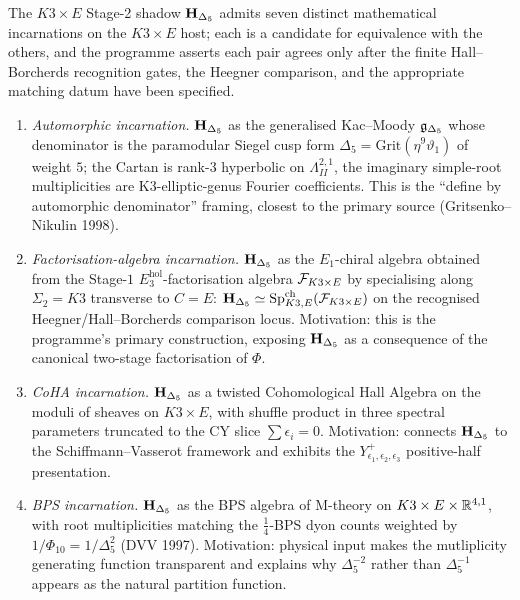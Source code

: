 \begin{theorem}\ClaimStatusConjectured
\label{wn:thm:healed-seven-incarnations}
The $K3 \times E$ Stage-2 shadow $\mathbf{H}_{\Delta_5}$ admits seven distinct
mathematical incarnations on the $K3 \times E$ host; each is a
candidate for equivalence with the others, and the programme asserts
each pair agrees only after the finite Hall--Borcherds recognition gates,
the Heegner comparison, and the appropriate matching datum have been
specified.
\begin{enumerate}[label=(\roman*)]
\item \emph{Automorphic incarnation.} $\mathbf{H}_{\Delta_5}$ as the generalised
Kac--Moody $\mathfrak{g}_{\Delta_5}$ whose denominator is the paramodular
Siegel cusp form $\Delta_5 = \mathrm{Grit}(\eta^9 \vartheta_1)$ of
weight $5$; the Cartan is rank-$3$ hyperbolic on
$\Lambda^{2,1}_{II}$, the imaginary simple-root multiplicities are
K3-elliptic-genus Fourier coefficients. This is the ``define by
automorphic denominator'' framing, closest to the primary source
(Gritsenko--Nikulin 1998).

\item \emph{Factorisation-algebra incarnation.} $\mathbf{H}_{\Delta_5}$ as
the $E_1$-chiral algebra obtained from the Stage-$1$
$E_3^{\mathrm{hol}}$-factorisation algebra $\mathcal{F}_{K3 \times E}$ by
specialising along $\Sigma_2 = K3$ transverse to $C = E$:
$\mathbf{H}_{\Delta_5} \simeq \mathrm{Sp}^{\mathrm{ch}}_{K3, E}(\mathcal{F}_{K3 \times E})$
on the recognised Heegner/Hall--Borcherds comparison locus.
Motivation: this is the programme's primary construction, exposing
$\mathbf{H}_{\Delta_5}$ as a consequence of the canonical two-stage
factorisation of $\Phi$.

\item \emph{CoHA incarnation.} $\mathbf{H}_{\Delta_5}$ as a twisted
Cohomological Hall Algebra on the moduli of sheaves on $K3 \times E$,
with shuffle product in three spectral parameters truncated to the
CY slice $\sum \epsilon_i = 0$. Motivation: connects $\mathbf{H}_{\Delta_5}$
to the Schiffmann--Vasserot framework and exhibits the
$Y^+_{\epsilon_1, \epsilon_2, \epsilon_3}$ positive-half presentation.

\item \emph{BPS incarnation.} $\mathbf{H}_{\Delta_5}$ as the BPS algebra of
M-theory on $K3 \times E \times \mathbb{R}^{4, 1}$, with root multiplicities
matching the $\frac{1}{4}$-BPS dyon counts weighted by $1/\Phi_{10}
= 1/\Delta_5^2$ (DVV 1997). Motivation: physical input makes the
mutliplicity generating function transparent and explains why
$\Delta_5^{-2}$ rather than $\Delta_5^{-1}$ appears as the natural
partition function.


\end{enumerate}
\end{theorem}
